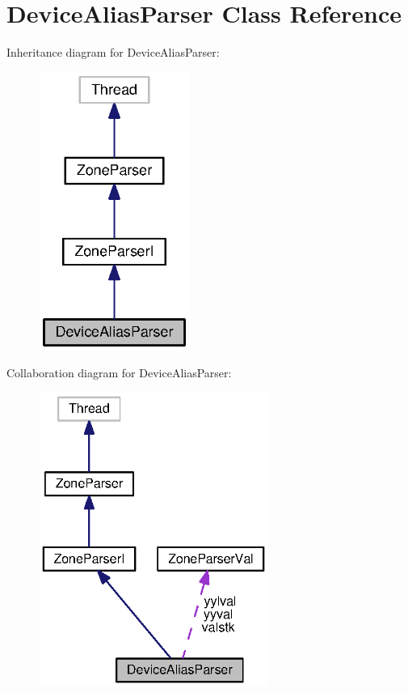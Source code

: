 \section{Device\-Alias\-Parser Class Reference}
\label{classorg_1_1smallfoot_1_1parser_1_1zone_1_1DeviceAliasParser}


Inheritance diagram for Device\-Alias\-Parser\-:\nopagebreak
\begin{figure}[H]
\begin{center}
\leavevmode
\includegraphics[width=140pt]{classorg_1_1smallfoot_1_1parser_1_1zone_1_1DeviceAliasParser__inherit__graph}
\end{center}
\end{figure}


Collaboration diagram for Device\-Alias\-Parser\-:\nopagebreak
\begin{figure}[H]
\begin{center}
\leavevmode
\includegraphics[width=213pt]{classorg_1_1smallfoot_1_1parser_1_1zone_1_1DeviceAliasParser__coll__graph}
\end{center}
\end{figure}
